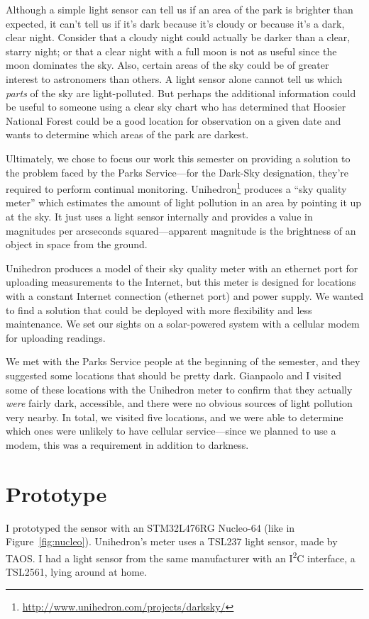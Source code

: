 \documentclass{article}
\begin{document}
Although a simple light sensor can tell us if an area of the park is brighter than expected, it can't tell us if it's dark because it's cloudy or because it's a dark, clear night. Consider that a cloudy night could actually be darker than a clear, starry night; or that a clear night with a full moon is not as useful since the moon dominates the sky. Also, certain areas of the sky could be of greater interest to astronomers than others. A light sensor alone cannot tell us which \emph{parts} of the sky are light-polluted. But perhaps the additional information could be useful to someone using a clear sky chart who has determined that Hoosier National Forest could be a good location for observation on a given date and wants to determine which areas of the park are darkest.

Ultimately, we chose to focus our work this semester on providing a solution to the problem faced by the Parks Service---for the Dark-Sky designation, they're required to perform continual monitoring. Unihedron\footnote{\url{http://www.unihedron.com/projects/darksky/}} produces a ``sky quality meter'' which estimates the amount of light pollution in an area by pointing it up at the sky. It just uses a light sensor internally and provides a value in magnitudes per arcseconds squared---apparent magnitude is the brightness of an object in space from the ground.

Unihedron produces a model of their sky quality meter with an ethernet port for uploading measurements to the Internet, but this meter is designed for locations with a constant Internet connection (ethernet port) and power supply. We wanted to find a solution that could be deployed with more flexibility and less maintenance. We set our sights on a solar-powered system with a cellular modem for uploading readings.

We met with the Parks Service people at the beginning of the semester, and they suggested some locations that should be pretty dark. Gianpaolo and I visited some of these locations with the Unihedron meter to confirm that they actually \emph{were} fairly dark, accessible, and there were no obvious sources of light pollution very nearby. In total, we visited five locations, and we were able to determine which ones were unlikely to have cellular service---since we planned to use a modem, this was a requirement in addition to darkness.

\section*{Prototype}
I prototyped the sensor with an STM32L476RG Nucleo-64 (like in Figure~\ref{fig:nucleo}). Unihedron's meter uses a TSL237 light sensor, made by TAOS. I had a light sensor from the same manufacturer with an I\textsuperscript{2}C interface, a TSL2561, lying around at home.
\end{document}
